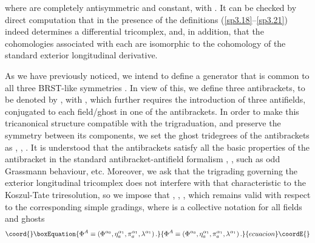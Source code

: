 \documentclass[a4paper,12pt]{article}
\begin{document}
where \coordHE{} are completely antisymmetric and constant, with \coordHE{}. It can be checked by direct computation that \coordHE{} in the presence of
the definitions (\ref{sp3.18}--\ref{sp3.21}) indeed determines a
differential tricomplex, and, in addition, that the cohomologies associated
with each \coordHE{} are isomorphic to the cohomology
of the standard exterior longitudinal derivative.

As we have previously noticed, we intend to define a generator that is
common to all three BRST-like symmetries \coordHE{}.
In view of this, we define three antibrackets, to be denoted by \coordHE{}, with \coordHE{}, which further requires the introduction of
three antifields, conjugated to each field/ghost in one of the antibrackets.
In order to make this tricanonical structure compatible with the
trigraduation, and preserve the symmetry between its components, we set the
ghost tridegrees of the antibrackets as \coordHE{}, \coordHE{}, \coordHE{}. It is understood that the
antibrackets satisfy all the basic properties of the antibracket in the
standard antibracket-antifield formalism \cite{8}, \cite{12}, such as odd
Grassmann behaviour, etc. Moreover, we ask that the trigrading governing the
exterior longitudinal tricomplex does not interfere with that characteristic
to the Koszul-Tate triresolution, so we impose that \coordHE{}, \coordHE{}, \coordHE{}, which remains valid with respect to the
corresponding simple gradings, where \coordHE{} is a collective notation
for all fields and ghosts 
\begin{equation}\coord{}\boxEquation{
\Phi ^{A}\equiv \left( \Phi ^{\alpha _{0}},\eta _{a}^{\alpha _{1}},\pi
_{a}^{\alpha _{1}},\lambda ^{\alpha _{1}}\right) .  \label{sp3.21a}
}{
\Phi ^{A}\equiv \left( \Phi ^{\alpha _{0}},\eta _{a}^{\alpha _{1}},\pi
_{a}^{\alpha _{1}},\lambda ^{\alpha _{1}}\right) .  }{ecuacion}\coordE{}\end{equation}
\end{document}
